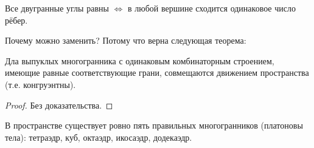 \begin{remark}
    Все двугранные углы равны $\Longleftrightarrow$ в любой вершине сходится одинаковое число рёбер.
\end{remark}

Почему можно заменить? Потому что верна следующая теорема:

\begin{theorem}[Коши]
    Дла выпуклых многогранника с одинаковым комбинаторным строением, имеющие равные соответствующие грани, совмещаются движением пространства (т.е. конгруэнтны).
\end{theorem}
\begin{proof}
    Без доказательства.
\end{proof}

\begin{theorem}
    В пространстве существует ровно пять правильных многогранников (платоновы тела): тетраэдр, куб, октаэдр, икосаэдр, додекаэдр.
\end{theorem}

